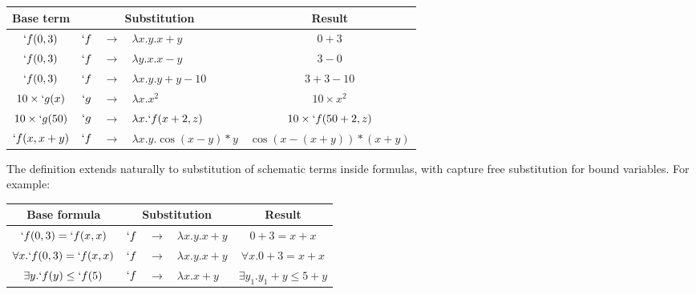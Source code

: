 \begin{example}
  \begin{center}
    \begin{tabular}{|c|r c l|c|}
      \noalign{\vspace{0.5em}}
      \hline
      Base term            & \multicolumn{3}{c|}{Substitution} & Result                                                                 \\
      \hline
      $`f(0, 3)$           & $`f$                              & $\rightarrow$ & $\lambda x.y. x+y$         & $0+3$                     \\
      $`f(0, 3)$           & $`f$                              & $\rightarrow$ & $\lambda y.x. x-y$         & $3-0$                     \\
      $`f(0, 3)$           & $`f$                              & $\rightarrow$ & $\lambda x.y. y+y-10$      & $3+3-10$                  \\
      $10 \times {`g(x)}$  & $`g$                              & $\rightarrow$ & $\lambda x. x^2$           & $10 \times x^2$           \\
      $10 \times {`g(50)}$ & $`g$                              & $\rightarrow$ & $\lambda x. `f(x+2, z)$    & $10 \times {`f(50+2, z)}$ \\
      $`f(x, x+y)$         & $`f$                              & $\rightarrow$ & $\lambda x.y. \cos(x-y)*y$ & $\cos(x-(x+y))*(x+y)$     \\
      \hline
    \end{tabular}
  \end{center}
\end{example}


The definition extends naturally to substitution of schematic terms inside formulas, with capture free substitution for bound variables. For example:

\begin{example}
  \begin{center}
    \begin{tabular}{|c|r c l|c|}
      \noalign{\vspace{0.5em}}
      \hline
      Base formula                     & \multicolumn{3}{c|}{Substitution} & Result                                                             \\
      \hline
      $`f(0, 3) = `f(x, x)$            & $`f$                              & $\rightarrow$ & $\lambda x.y. x+y$ & $0+3 = x+x$                   \\
      $\forall x. `f(0, 3) = `f(x, x)$ & $`f$                              & $\rightarrow$ & $\lambda x.y. x+y$ & $\forall x. 0+3 = x+x$        \\

      $\exists y. `f(y) \leq `f(5)$    & $`f$                              & $\rightarrow$ & $\lambda x. x+y$   & $\exists y_1. y_1+y \leq 5+y$ \\

      \hline
    \end{tabular}
  \end{center}
\end{example}

